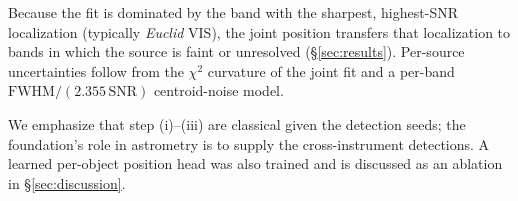 Because the fit is dominated by the band with the sharpest, highest-SNR
localization (typically \textit{Euclid} VIS), the joint position transfers that
localization to bands in which the source is faint or unresolved
(\S\ref{sec:results}). Per-source uncertainties follow from the $\chi^2$
curvature of the joint fit and a per-band $\mathrm{FWHM}/(2.355\,\mathrm{SNR})$
centroid-noise model.

We emphasize that step (i)--(iii) are classical given the detection seeds; the
foundation's role in astrometry is to supply the cross-instrument detections.
A learned per-object position head was also trained and is discussed as an
ablation in \S\ref{sec:discussion}.
